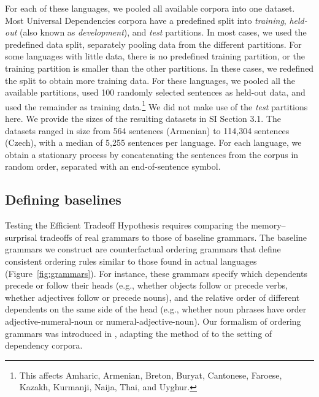 For each of these languages, we pooled all available corpora into one dataset.
Most Universal Dependencies corpora have a predefined split into \emph{training}, \emph{held-out} (also known as \emph{development}), and \emph{test} partitions.
In most cases, we used the predefined data split, separately pooling data from the different partitions. 
For some languages with little data, there is no predefined training partition, or the training partition is smaller than the other partitions.
In these cases, we redefined the split to obtain more training data.
For these languages, we pooled all the available partitions, used 100 randomly selected sentences as held-out data, and used the remainder as training data.\footnote{This affects Amharic, Armenian, Breton, Buryat, Cantonese, Faroese, Kazakh, Kurmanji, Naija, Thai, and Uyghur.}
We did not make use of the \textit{test} partitions here.
We provide the sizes of the resulting datasets in SI Section 3.1.
The datasets ranged in size from 564 sentences (Armenian) to 114,304 sentences (Czech), with a median of 5,255 sentences per language.
For each language, we obtain a stationary process by concatenating the sentences from the corpus in random order, separated with an end-of-sentence symbol.


\subsection{Defining baselines}\label{sec:baselines}

Testing the Efficient Tradeoff Hypothesis requires comparing the memory--surprisal tradeoffs of real grammars to those of baseline grammars. The baseline grammars we construct are counterfactual ordering grammars that define consistent ordering rules similar to those found in actual languages (Figure~\ref{fig:grammars}).
For instance, these grammars specify which dependents precede or follow their heads (e.g., whether objects follow or precede verbs, whether adjectives follow or precede nouns), and the relative order of different dependents on the same side of the head (e.g., whether noun phrases have order adjective-numeral-noun or numeral-adjective-noun). Our formalism of ordering grammars was introduced in \citet{hahn2020universals}, adapting the method of \citet{gildea-optimizing-2007,gildea-grammars-2010} to the setting of dependency corpora.


